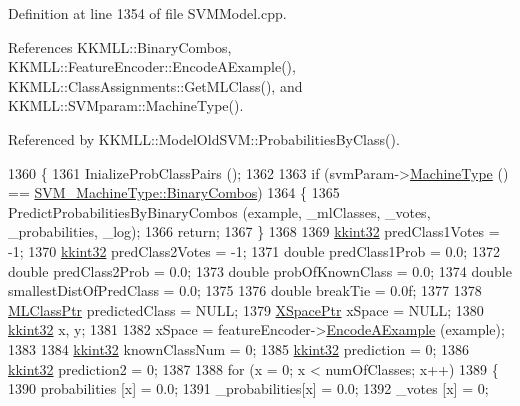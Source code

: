Definition at line 1354 of file S\+V\+M\+Model.\+cpp.



References K\+K\+M\+L\+L\+::\+Binary\+Combos, K\+K\+M\+L\+L\+::\+Feature\+Encoder\+::\+Encode\+A\+Example(), K\+K\+M\+L\+L\+::\+Class\+Assignments\+::\+Get\+M\+L\+Class(), and K\+K\+M\+L\+L\+::\+S\+V\+Mparam\+::\+Machine\+Type().



Referenced by K\+K\+M\+L\+L\+::\+Model\+Old\+S\+V\+M\+::\+Probabilities\+By\+Class().


\begin{DoxyCode}
1360 \{
1361   InializeProbClassPairs ();
1362 
1363   \textcolor{keywordflow}{if}  (svmParam->\hyperlink{class_k_k_m_l_l_1_1_s_v_mparam_a30153e00007f9cf65343e0ad97ad61fb}{MachineType} () == \hyperlink{namespace_k_k_m_l_l_ad917464bc631109a3021cf02cd27af9aa01ad67463554c5f5552dcc6b5f4a553f}{SVM\_MachineType::BinaryCombos})
1364   \{
1365     PredictProbabilitiesByBinaryCombos (example, \_mlClasses, \_votes, \_probabilities, \_log);
1366     \textcolor{keywordflow}{return};
1367   \}
1368 
1369   \hyperlink{namespace_k_k_b_a8fa4952cc84fda1de4bec1fbdd8d5b1b}{kkint32}  predClass1Votes         = -1;
1370   \hyperlink{namespace_k_k_b_a8fa4952cc84fda1de4bec1fbdd8d5b1b}{kkint32}  predClass2Votes         = -1;
1371   \textcolor{keywordtype}{double}   predClass1Prob          = 0.0;
1372   \textcolor{keywordtype}{double}   predClass2Prob          = 0.0;
1373   \textcolor{keywordtype}{double}   probOfKnownClass        = 0.0;
1374   \textcolor{keywordtype}{double}   smallestDistOfPredClass = 0.0;
1375 
1376   \textcolor{keywordtype}{double}   breakTie                = 0.0f;
1377 
1378   \hyperlink{class_k_k_m_l_l_1_1_m_l_class}{MLClassPtr}  predictedClass  = NULL;
1379   \hyperlink{struct_s_v_m233_1_1svm__node}{XSpacePtr}   xSpace          = NULL;
1380   \hyperlink{namespace_k_k_b_a8fa4952cc84fda1de4bec1fbdd8d5b1b}{kkint32}     x, y;
1381 
1382   xSpace = featureEncoder->\hyperlink{class_k_k_m_l_l_1_1_feature_encoder_af82278dec57d34f3ebcf6ea97cc625d2}{EncodeAExample} (example);
1383 
1384   \hyperlink{namespace_k_k_b_a8fa4952cc84fda1de4bec1fbdd8d5b1b}{kkint32}  knownClassNum = 0;
1385   \hyperlink{namespace_k_k_b_a8fa4952cc84fda1de4bec1fbdd8d5b1b}{kkint32}  prediction    = 0;
1386   \hyperlink{namespace_k_k_b_a8fa4952cc84fda1de4bec1fbdd8d5b1b}{kkint32}  prediction2   = 0;
1387 
1388   \textcolor{keywordflow}{for}  (x = 0;  x < numOfClasses;  x++)
1389   \{
1390     probabilities [x] = 0.0;
1391     \_probabilities[x] = 0.0;
1392     \_votes        [x] = 0;

\end{DoxyCode}
